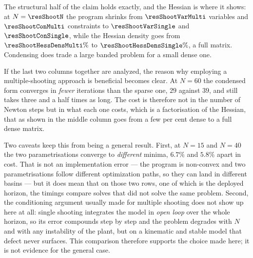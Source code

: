 \documentclass[11pt,a4paper]{article}
\begin{document}
\begin{table}[htbp]
  \centering
  \small
  \caption{%
  Multiple (M) against single (S) shooting on the same instance, at the deployed profile. Dimensions,
  densities and iteration counts are exact; each timing is the fastest of three cold solves, with no warm
  start. The table shows the comparison for the number of variables, number of constraints, the Hessian density, the number of iterations and the solve time needed by each method for different lenghts of the prediction horizon N.}
  \label{res:tab:shoot}
\end{table}

The structural half of the claim holds exactly, and the Hessian is where it shows: at $N=\resShootN$ the
program shrinks from $\resShootVarMulti$ variables and $\resShootConMulti$ constraints to
$\resShootVarSingle$ and $\resShootConSingle$, while the Hessian density goes from
$\resShootHessDensMulti\%$ to $\resShootHessDensSingle\%$, a full matrix. Condensing does trade a large
banded problem for a small dense one.

If the last two columns together are analyzed, the reason why employing a multiple-shooting approach is beneficial becomes clear. At $N=60$ the condensed form converges in \emph{fewer} iterations than
the sparse one, $29$ against $39$, and still takes three and a half times as long. The cost is therefore not
in the number of Newton steps but in what each one costs, which is a factorisation of the Hessian, that as shown in the middle column goes from a few per cent dense to a full dense matrix.

Two caveats keep this from being a general result. First, at $N=15$ and $N=40$ the two parametrisations
converge to \emph{different} minima, $6.7\%$ and $5.8\%$ apart in cost. That is not an implementation
error --- the program is non-convex and two parametrisations follow different optimization paths, so they can
land in different basins --- but it does mean that on those two rows, one of which is the deployed horizon,
the timings compare solves that did not solve the same problem. Second, the conditioning argument usually
made for multiple shooting does not show up here at all: single shooting integrates the model in
\emph{open loop} over the whole horizon, so its error compounds step by step and the problem degrades with
$N$ and with any instability of the plant, but on a kinematic and stable model that defect never surfaces.
This comparison therefore supports the choice made here; it is not evidence for the general case.
\end{document}
